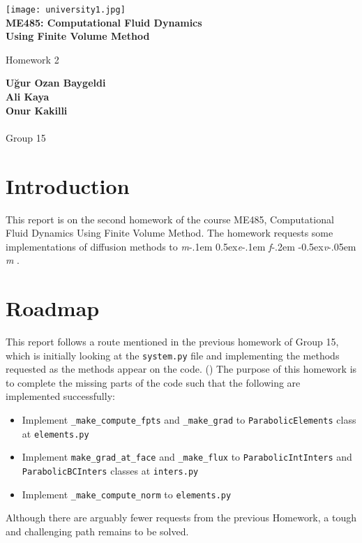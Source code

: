 \documentclass[a4paper, 12pt]{article}
\newcommand\mefvm{%
    \textit{m}\kern-.1em%
    \raise0.5ex\hbox{\textit{e}}\kern-.1em%
    \textit{f}\kern-.2em%
    \raise-0.5ex\hbox{\textit{v}}\kern-.05em%
    \textit{m}
}
\begin{document}
\doublespacing
\begin{titlepage}
    \begin{center}
        \texttt{[image: university1.jpg]}\\
        
        \textbf{ME485: Computational Fluid Dynamics \\ Using Finite Volume Method}

        \vspace{0.5cm}
        Homework 2
            
        \vspace{1.5cm}

        \textbf{Uğur Ozan Baygeldi}\\
        \textbf{Ali Kaya}\\ 
        \textbf{Onur Kakilli}\\~\\
        Group 15
        
    \end{center}
\end{titlepage}

\section{Introduction}

This report is on the second homework of the course ME485, Computational Fluid Dynamics Using Finite Volume Method. The homework requests some implementations of diffusion methods to \mefvm\!. \nocite{gi}

\section{Roadmap}

This report follows a route mentioned in the previous homework of Group 15, which is initially looking at the \verb|system.py| file and implementing the methods requested as the methods appear on the code. (\cite{hw1}) The purpose of this homework is to complete the missing parts of the code such that the following are implemented successfully:
\begin{itemize}
    \item Implement \verb|_make_compute_fpts| and \verb|_make_grad| to \verb|ParabolicElements| class at \verb|elements.py|
    \item Implement \verb|make_grad_at_face| and \verb|_make_flux| to \verb|ParabolicIntInters| and \\ \verb|ParabolicBCInters| classes at \verb|inters.py|
    \item Implement \verb|_make_compute_norm| to \verb|elements.py|
 \end{itemize}\par
Although there are arguably fewer requests from the previous Homework, a tough and challenging path remains to be solved.
\end{document}

